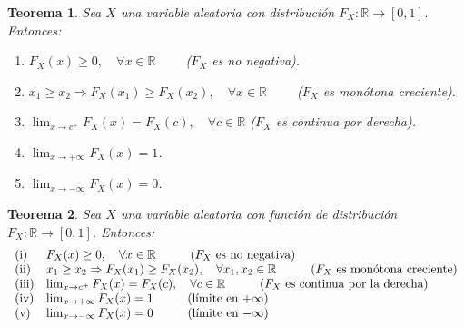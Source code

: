 \documentclass{report}
\newtheorem{thm}{Teorema}[section]
\begin{document}
\begin{thm}
Sea $X$ una variable aleatoria con distribución $F_X:\mathbb{R}\rightarrow[0,1]$. Entonces:
\begin{enumerate}
\item $F_X(x)\geq 0, \quad \forall x \in \mathbb{R} \qquad$ ($F_X$ es no negativa).
\item $ x_1 \geq x_2 \Rightarrow F_X(x_1)\geq F_X(x_2), \quad \forall x \in \mathbb{R} \qquad$ ($F_X$ es monótona creciente).
\item $\lim_{x\rightarrow c^+}F_X(x) = F_X(c), \quad \forall c \in \mathbb{R}$ ($F_X$ es continua por derecha).
\item $\lim_{x\rightarrow +\infty}F_X(x) = 1 $.
\item $\lim_{x\rightarrow -\infty}F_X(x) = 0 $.
\end{enumerate}
\end{thm}

\begin{thm}
Sea \( X \) una variable aleatoria con función de distribución \( F_X:\mathbb{R}\rightarrow[0,1] \). Entonces:
\[
\begin{array}{ll}
\text{(i)} & F_X(x)\geq 0, \quad \forall x \in \mathbb{R} \hspace{1cm} \text{($F_X$ es no negativa)} \\
\text{(ii)} & x_1 \geq x_2 \Rightarrow F_X(x_1)\geq F_X(x_2), \quad \forall x_1,x_2 \in \mathbb{R} \hspace{1cm} \text{($F_X$ es monótona creciente)} \\
\text{(iii)} & \lim_{x\rightarrow c^+}F_X(x) = F_X(c), \quad \forall c \in \mathbb{R} \hspace{1cm} \text{($F_X$ es continua por la derecha)} \\
\text{(iv)} & \lim_{x\rightarrow +\infty}F_X(x) = 1 \hspace{1cm} \text{(límite en \( +\infty \))} \\
\text{(v)} & \lim_{x\rightarrow -\infty}F_X(x) = 0 \hspace{1cm} \text{(límite en \( -\infty \))} \\
\end{array}
\]
\end{thm}
\end{document}
